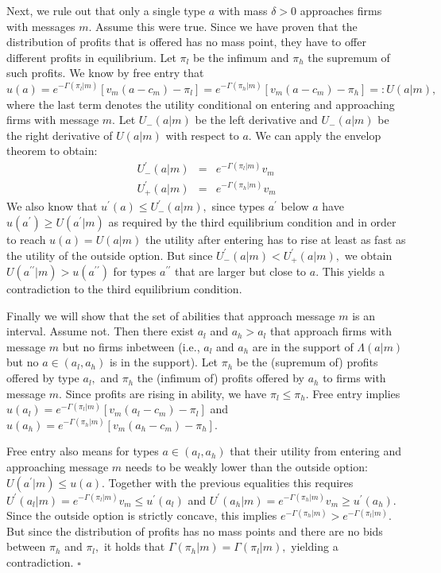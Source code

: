 \documentclass[12pt]{article}
\theoremstyle{plain}
\begin{document}
Next, we rule out that only a single type $a$ with mass $\delta >0$
approaches firms with messages $m$. Assume this were true. Since we have
proven that the distribution of profits that is offered has no mass point,
they have to offer different profits in equilibrium. Let $\pi _{l}$ be the
infimum and $\pi _{h}$ the supremum of such profits. We know by free entry
that $u(a)=e^{-\Gamma (\pi _{l}|m)}\left[ v_{m}(a-c_{m})-\pi _{l}\right]
=e^{-\Gamma (\pi _{h}|m)}\left[ v_{m}(a-c_{m})-\pi _{h}\right] =:U(a|m),$
where the last term denotes the utility conditional on entering and
approaching firms with message $m.$ Let $U_{-}(a|m)$ be the left derivative
and $U_{-}(a|m)$ be the right derivative of $U(a|m)$ with respect to $a.$ We
can apply the envelop theorem to obtain:%
\begin{eqnarray*}
U_{-}^{\prime }(a|m) &=&e^{-\Gamma (\pi _{l}|m)}v_{m} \\
U_{+}^{\prime }(a|m) &=&e^{-\Gamma (\pi _{h}|m)}v_{m}
\end{eqnarray*}%
We also know that $u^{\prime }(a)\leq U_{-}^{\prime }(a|m),$ since types $%
a^{\prime }$ below $a$ have $u(a^{\prime })\geq U(a^{\prime }|m)$ as
required by the third equilibrium condition and in order to reach $%
u(a)=U(a|m)$ the utility after entering has to rise at least as fast as the
utility of the outside option. But since $U_{-}^{\prime }(a|m)<U_{+}^{\prime
}(a|m),$ we obtain $U(a^{\prime \prime }|m)>u(a^{\prime \prime })$ for types 
$a^{\prime \prime }$ that are larger but close to $a.$ This yields a
contradiction to the third equilibrium condition.

Finally we will show that the set of abilities that approach message $m$ is
an interval. Assume not. Then there exist $a_{l}$ and $a_{h}>a_{l}$ that
approach firms with message $m$ but no firms inbetween (i.e., $a_{l}$ and $%
a_{h}$ are in the support of $\Lambda (a|m)$ but no $a\in (a_{l},a_{h})$ is
in the support). Let $\pi _{h}$ be the (supremum of) profits offered by type 
$a_{l},$ and $\pi _{h}$ the (infimum of) profits offered by $a_{h}$ to firms
with message $m.$ Since profits are rising in ability, we have $\pi _{l}\leq
\pi _{h}.$ Free entry implies $u(a_{l})=e^{-\Gamma (\pi _{l}|m)}\left[
v_{m}(a_{l}-c_{m})-\pi _{l}\right] $ and $u(a_{h})=e^{-\Gamma (\pi _{h}|m)}%
\left[ v_{m}(a_{h}-c_{m})-\pi _{h}\right] .$

Free entry also means for types $a\in (a_{l},a_{h})$ that their utility from
entering and approaching message $m$ needs to be weakly lower than the
outside option: $U(a^{\prime }|m)\leq u(a).$ Together with the previous
equalities this requires $U^{\prime }(a_{l}|m)=e^{-\Gamma (\pi
_{l}|m)}v_{m}\leq u^{\prime }(a_{l})$ and $U^{\prime }(a_{h}|m)=e^{-\Gamma
(\pi _{h}|m)}v_{m}\geq u^{\prime }(a_{h}).$ Since the outside option is
strictly concave, this implies $e^{-\Gamma (\pi _{h}|m)}>e^{-\Gamma (\pi
_{l}|m)}.$ But since the distribution of profits has no mass points and
there are no bids between $\pi _{h}$ and $\pi _{l},$ it holds that $\Gamma
(\pi _{h}|m)=\Gamma (\pi _{l}|m),$ yielding a contradiction. $\square $
\end{document}
